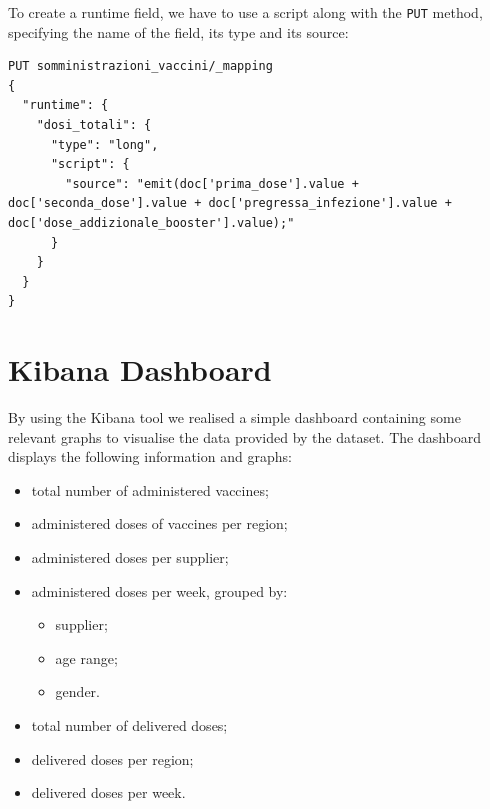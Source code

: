 \documentclass{article}
\begin{document}
\begin{enumerate}
To create a runtime field, we have to use a script along with the \verb|PUT| method, specifying the name of the field, its type and its source:
\begin{lstlisting}
PUT somministrazioni_vaccini/_mapping
{
  "runtime": {
    "dosi_totali": {
      "type": "long",
      "script": {
        "source": "emit(doc['prima_dose'].value + doc['seconda_dose'].value + doc['pregressa_infezione'].value + doc['dose_addizionale_booster'].value);"
      }
    }
  }
}
\end{lstlisting}
\end{enumerate}

\section{Kibana Dashboard}
By using the Kibana tool we realised a simple dashboard containing some relevant graphs to visualise the data provided by the dataset.
The dashboard displays the following information and graphs:
\begin{itemize}
    \item total number of administered vaccines;
    \item administered doses of vaccines per region;
    \item administered doses per supplier;
    \item administered doses per week, grouped by:
    \begin{itemize}
        \item supplier;
        \item age range;
        \item gender.
    \end{itemize}
    \item total number of delivered doses;
    \item delivered doses per region;
    \item delivered doses per week.
\end{itemize}
\end{document}
